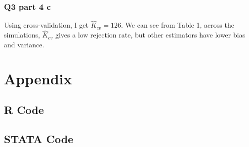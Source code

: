 \documentclass[11pt]{article}
\begin{document}
\begin{center}
	
\end{center}


\subsubsection{Q3 part 4 c}

Using cross-validation, I get $\hat{K}_{cv} = 126$. We can see from Table 1, across the simulations,
$\hat{K}_{cv}$ gives a  low rejection rate, but other estimators have lower bias and variance.

\section{Appendix}
\subsection{R Code}

 

\subsection{STATA Code}
 


\end{document}
